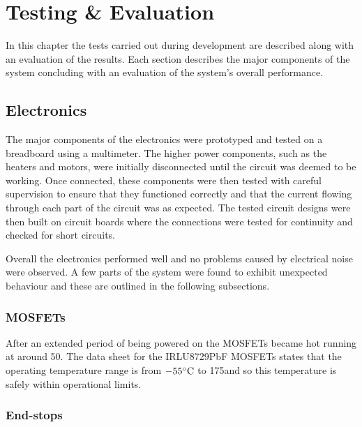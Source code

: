 \chapter{Testing \& Evaluation}
	
	
	\label{sec:testing}
	
	In this chapter the tests carried out during development are described along
	with an evaluation of the results. Each section describes the major components
	of the system concluding with an evaluation of the system's overall
	performance.
	
	\section{Electronics}
		
		The major components of the electronics were prototyped and tested on a
		breadboard using a multimeter. The higher power components, such as the
		heaters and motors, were initially disconnected until the circuit was deemed
		to be working. Once connected, these components were then tested with
		careful supervision to ensure that they functioned correctly and that the
		current flowing through each part of the circuit was as expected. The tested
		circuit designs were then built on circuit boards where the connections were
		tested for continuity and checked for short circuits.
		
		Overall the electronics performed well and no problems caused by electrical
		noise were observed. A few parts of the system were found to exhibit
		unexpected behaviour and these are outlined in the following subsections.
		
		\subsection{MOSFETs}
			
			After an extended period of being powered on the MOSFETs became hot
			running at around 50\dC. The data sheet for the IRLU8729PbF MOSFETs states
			that the operating temperature range is from $-55^\circ\textrm{C}{}$ to 175\dC and so
			this temperature is safely within operational limits.
			
		
		\subsection{End-stops}
			
